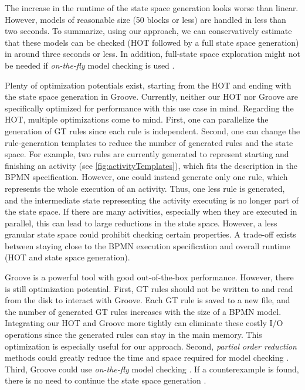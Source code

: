 \documentclass{lmcs} %
\begin{document}
The increase in the runtime of the state space generation looks worse than linear.
However, models of reasonable size (50 blocks or less) are handled in less than two seconds.
To summarize, using our approach, we can conservatively estimate that these models can be checked (HOT followed by a full state space generation) in around three seconds or less.
In addition, full-state space exploration might not be needed if \textit{on-the-fly} model checking is used \cite{clarkeHandbookModelChecking2018}.

Plenty of optimization potentials exist, starting from the HOT and ending with the state space generation in Groove.
Currently, neither our HOT nor Groove are specifically optimized for performance with this use case in mind.
Regarding the HOT, multiple optimizations come to mind.
First, one can parallelize the generation of GT rules since each rule is independent.
Second, one can change the rule-generation templates to reduce the number of generated rules and the state space.
For example, two rules are currently generated to represent starting and finishing an activity (see \autoref{fig:activityTemplates}), which fits the description in the BPMN specification.
However, one could instead generate only one rule, which represents the whole execution of an activity.
Thus, one less rule is generated, and the intermediate state representing the activity executing is no longer part of the state space.
If there are many activities, especially when they are executed in parallel, this can lead to large reductions in the state space.
However, a less granular state space could prohibit checking certain properties.
A trade-off exists between staying close to the BPMN execution specification and overall runtime (HOT and state space generation).

Groove is a powerful tool with good out-of-the-box performance.
However, there is still optimization potential.
First, GT rules should not be written to and read from the disk to interact with Groove.
Each GT rule is saved to a new file, and the number of generated GT rules increases with the size of a BPMN model.
Integrating our HOT and Groove more tightly can eliminate these costly I/O operations since the generated rules can stay in the main memory.
This optimization is especially useful for our approach.
Second, \textit{partial order reduction} methods could greatly reduce the time and space required for model checking \cite{clarkeHandbookModelChecking2018}.
Third, Groove could use \textit{on-the-fly} model checking \cite{kastenbergModelCheckingDynamic2006}.
If a counterexample is found, there is no need to continue the state space generation \cite{clarkeHandbookModelChecking2018}.
\end{document}
